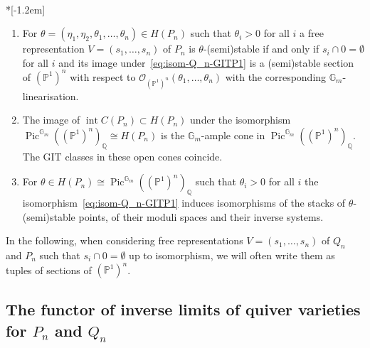 \documentclass[ALCO,ThmDefs,Unicode,epreuves]{cedram}
\def\Q{\mathds Q}
\def\G{\mathds G}
\def\P{\mathds P}
\def\O{\mathcal O}
\DeclareMathOperator{\interior}{int}
\DeclareMathOperator{\Pic}{Pic}
\begin{document}
\begin{coro}\label{cor:reprPn-P1n-GIT}\ \\*[-1.2em]

\begin{enumerate}[label=(\alph*)]
\item\label{coro2.12_a} 
For $\theta=(\eta_1,\eta_2,\theta_1,\ldots,\theta_n)\in H(P_n)$ such that 
$\theta_i>0$ for all $i$ a free representation $V=(s_1,\ldots,s_n)$ of $P_n$ is 
$\theta$-(semi)stable if and only if $s_i\cap 0=\emptyset$ for all $i$ and its 
image under~\eqref{eq:isom-Q_n-GITP1} is a (semi)stable section of $(\P^1)^n$
with respect to $\O_{(\P^1)^n}(\theta_1,\ldots,\theta_n)$ with the corresponding 
$\G_m$-linearisation. %

\item\label{coro2.12_b} 
The image of $\interior C(P_n)\subset H(P_n)$ under the isomorphism 
$\Pic^{\G_m}((\P^1)^n)_\Q\cong H(P_n)$ is the $\G_m$-ample cone in 
$\Pic^{\G_m}((\P^1)^n)_\Q$. The GIT classes in these open cones coincide.%

\item\label{coro2.12_c} 
For $\theta\in H(P_n)\cong\Pic^{\G_m}((\P^1)^n)_\Q$ such that 
$\theta_i>0$ for all $i$ the isomorphism~\eqref{eq:isom-Q_n-GITP1} induces 
isomorphisms of the stacks of $\theta$-(semi)stable points, of their moduli spaces 
and their inverse systems.
\end{enumerate}
\end{coro}

In the following, when considering free representations $V=(s_1,\ldots,s_n)$
of $Q_n$ and $P_n$ such that $s_i\cap 0=\emptyset$ up to isomorphism,
we will often write them as tuples of sections of $(\P^1)^n$.



\subsection{The functor of inverse limits of quiver varieties for \texorpdfstring{$P_n$}{Pn} and \texorpdfstring{$Q_n$}{QN}}
\label{subsec:functor-limPnQn}
\end{document}
